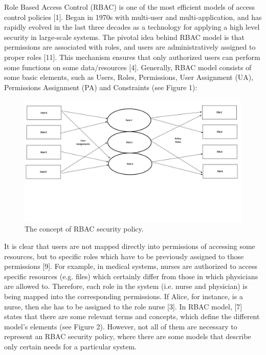 Role Based Access Control (RBAC) is one of the most efficient models of access control policies [1].  Began in 1970s with multi-user and multi-application, and has rapidly evolved in the last three decades as a technology for applying a high level security in large-scale systems.  The pivotal idea behind RBAC model is that permissions are associated with roles, and users are administratively assigned to proper roles [11]. This mechanism ensures that only authorized users can perform some functions on some data/resources [4]. Generally, RBAC model consists of some basic elements, such as Users, Roles, Permissions, User Assignment (UA), Permissions Assignment (PA) and Constraints (see Figure 1):

\begin{figure}[bht]
\centering
\includegraphics[scale=0.4]{RBACpolicy.jpg}
\caption{The concept of RBAC security policy.}
\label{fig:RBACPol}
\end{figure}


It is clear that users are not mapped directly into permissions of accessing some resources, but to specific roles which have to be previously assigned to those permissions [9].  For example, in medical systems, nurses are authorized to access specific resources (e.g. files) which certainly differ from those in which physicians are allowed to.  Therefore, each role in the system (i.e. nurse and physician) is being mapped into the corresponding permissions.  If Alice, for instance, is a nurse, then she has to be assigned to the role nurse [3]. 
      In RBAC model, [7] states that there are some relevant terms and concepts, which define the different model’s elements (see Figure 2).  However, not all of them are necessary to represent an RBAC security policy, where there are some models that describe only certain needs for a particular system.

